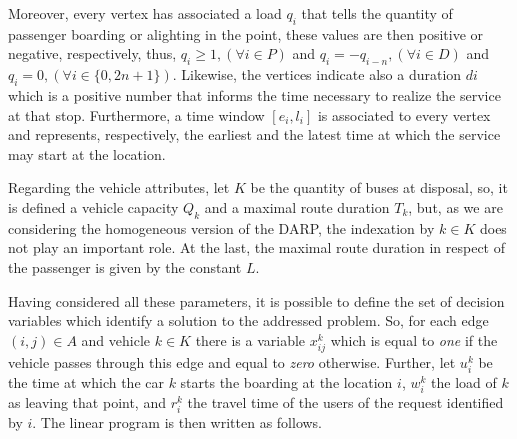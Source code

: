 \documentclass[tuberlin,cic,tc,openright,english,noabntcite,oneside]{iiufrgs}
\begin{document}
Moreover, every vertex has associated a load $q_{i}$ that tells the quantity of passenger boarding or alighting in the point, these values are then positive or negative, respectively, thus, $q_{i}\geq 1, (\forall i \in P)$ and $q_{i} = -q_{i-n}, (\forall i \in D)$ and $q_{i} = 0, (\forall i \in \{0,2n+1\})$. Likewise, the vertices indicate also a duration $d{i}$ which is a positive number that informs the time necessary to realize the service at that stop. Furthermore, a time window $[e_{i}, l_{i}]$ is associated to every vertex and represents, respectively, the earliest and the latest time at which the service may start at the location.

Regarding the vehicle attributes, let $K$ be the quantity of buses at disposal, so, it is defined a vehicle capacity $Q_{k}$ and a maximal route duration $T_{k}$, but, as we are considering the homogeneous version of the DARP, the indexation by $k \in K$ does not play an important role. At the last, the maximal route duration in respect of the passenger is given by the constant $L$.

Having considered all these parameters, it is possible to define the set of decision variables which identify a solution to the addressed problem. So, for each edge $(i,j) \in A$ and vehicle $k \in K$ there is a variable $x_{ij}^k$ which is equal to \emph{one} if the vehicle passes through this edge and equal to \emph{zero} otherwise. Further, let $u_i^k$ be the time at which the car $k$ starts the boarding at the location $i$, $w_i^k$ the load of $k$ as leaving that point, and $r_i^k$ the travel time of the users of the request identified by $i$. The linear program is then written as follows.
\end{document}
